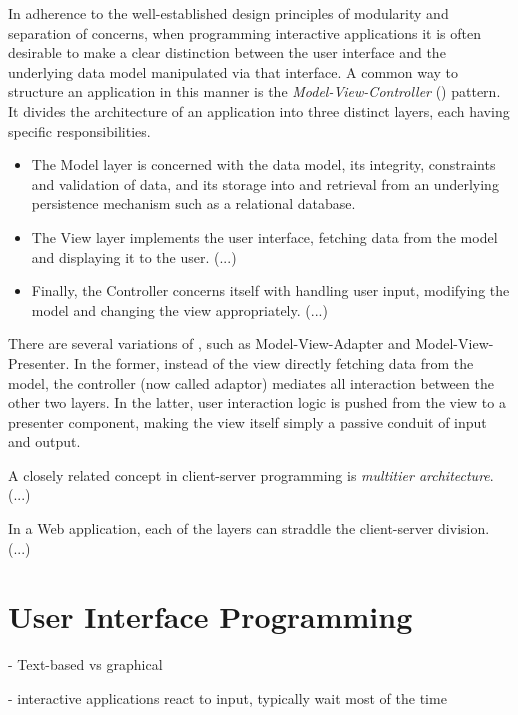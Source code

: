 In adherence to the well-established design principles of modularity and separation of concerns, when programming interactive applications it is often desirable to make a clear distinction between the user interface and the underlying data model manipulated via that interface. A common way to structure an application in this manner is the \emph{Model-View-Controller} () pattern. It divides the architecture of an application into three distinct layers, each having specific responsibilities.

\begin{itemize}

    \item The Model layer is concerned with the data model, its integrity, constraints and validation of data, and its storage into and retrieval from an underlying persistence mechanism such as a relational database.
    
    \item The View layer implements the user interface, fetching data from the model and displaying it to the user. (...)
    
    \item Finally, the Controller concerns itself with handling user input, modifying the model and changing the view appropriately. (...)

\end{itemize}

There are several variations of , such as Model-View-Adapter and Model-View-Presenter. In the former, instead of the view directly fetching data from the model, the controller (now called adaptor) mediates all interaction between the other two layers. In the latter, user interaction logic is pushed from the view to a presenter component, making the view itself simply a passive conduit of input and output.

A closely related concept in client-server programming is \emph{multitier architecture}. (...)

In a Web application, each of the layers can straddle the client-server division. (...)

\section{User Interface Programming}

- Text-based vs graphical

- interactive applications react to input, typically wait most of the time

